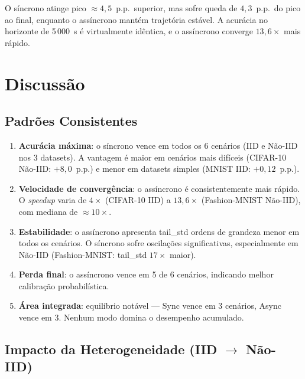 \documentclass[12pt, a4paper]{article}
\begin{document}
O síncrono atinge pico $\approx 4{,}5$~p.p.\ superior, mas sofre queda de $4{,}3$~p.p.\
do pico ao final, enquanto o assíncrono mantém trajetória estável. A acurácia no
horizonte de 5\,000~s é virtualmente idêntica, e o assíncrono converge
$13{,}6{\times}$ mais rápido.

\section{Discussão}

\subsection{Padrões Consistentes}

\begin{enumerate}
    \item \textbf{Acurácia máxima}: o síncrono vence em todos os 6 cenários
    (IID e Não-IID nos 3 datasets). A vantagem é maior em cenários mais difíceis
    (CIFAR-10 Não-IID: $+8{,}0$~p.p.) e menor em datasets simples (MNIST IID:
    $+0{,}12$~p.p.).

    \item \textbf{Velocidade de convergência}: o assíncrono é consistentemente mais
    rápido. O \textit{speedup} varia de $4{\times}$ (CIFAR-10 IID) a $13{,}6{\times}$
    (Fashion-MNIST Não-IID), com mediana de $\approx 10{\times}$.

    \item \textbf{Estabilidade}: o assíncrono apresenta tail\_std ordens de grandeza
    menor em todos os cenários. O síncrono sofre oscilações significativas,
    especialmente em Não-IID (Fashion-MNIST: tail\_std $17{\times}$ maior).

    \item \textbf{Perda final}: o assíncrono vence em 5 de 6 cenários, indicando
    melhor calibração probabilística.

    \item \textbf{Área integrada}: equilíbrio notável --- Sync vence em 3 cenários,
    Async vence em 3. Nenhum modo domina o desempenho acumulado.
\end{enumerate}

\subsection{Impacto da Heterogeneidade (IID $\to$ Não-IID)}
\end{document}
